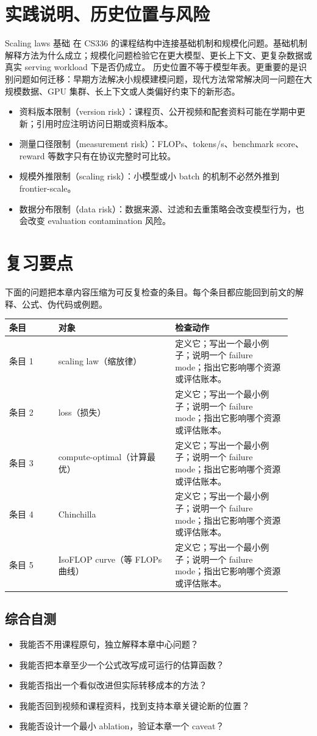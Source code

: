 \documentclass[a4paper]{article}
\begin{document}
\section{实践说明、历史位置与风险}
Scaling laws 基础 在 CS336 的课程结构中连接基础机制和规模化问题。基础机制解释方法为什么成立；规模化问题检验它在更大模型、更长上下文、更复杂数据或真实 serving workload 下是否仍成立。
历史位置不等于模型年表。更重要的是识别问题如何迁移：早期方法解决小规模建模问题，现代方法常常解决同一问题在大规模数据、GPU 集群、长上下文或人类偏好约束下的新形态。
\begin{itemize}
\item 资料版本限制（version risk）：课程页、公开视频和配套资料可能在学期中更新；引用时应注明访问日期或资料版本。
\item 测量口径限制（measurement risk）：FLOPs、tokens/s、benchmark score、reward 等数字只有在协议完整时可比较。
\item 规模外推限制（scaling risk）：小模型或小 batch 的机制不必然外推到 frontier-scale。
\item 数据分布限制（data risk）：数据来源、过滤和去重策略会改变模型行为，也会改变 evaluation contamination 风险。
\end{itemize}
\section{复习要点}
下面的问题把本章内容压缩为可反复检查的条目。每个条目都应能回到前文的解释、公式、伪代码或例题。
\begin{longtable}{p{0.16\linewidth}p{0.38\linewidth}p{0.38\linewidth}}
\toprule
\textbf{条目} & \textbf{对象} & \textbf{检查动作}\\
\midrule
条目 1 & scaling law（缩放律） & 定义它；写出一个最小例子；说明一个 failure mode；指出它影响哪个资源或评估账本。\\
条目 2 & loss（损失） & 定义它；写出一个最小例子；说明一个 failure mode；指出它影响哪个资源或评估账本。\\
条目 3 & compute-optimal（计算最优） & 定义它；写出一个最小例子；说明一个 failure mode；指出它影响哪个资源或评估账本。\\
条目 4 & Chinchilla & 定义它；写出一个最小例子；说明一个 failure mode；指出它影响哪个资源或评估账本。\\
条目 5 & IsoFLOP curve（等 FLOPs 曲线） & 定义它；写出一个最小例子；说明一个 failure mode；指出它影响哪个资源或评估账本。\\
\bottomrule
\end{longtable}
\subsection{综合自测}
\begin{itemize}
\item 我能否不用课程原句，独立解释本章中心问题？
\item 我能否把本章至少一个公式改写成可运行的估算函数？
\item 我能否指出一个看似改进但实际转移成本的方法？
\item 我能否回到视频和课程资料，找到支持本章关键论断的位置？
\item 我能否设计一个最小 ablation，验证本章一个 caveat？
\end{itemize}
\end{document}
